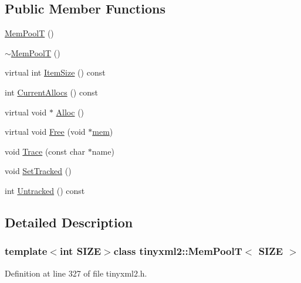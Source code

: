\subsection*{Public Member Functions}
\begin{DoxyCompactItemize}
\item 
\hyperlink{classtinyxml2_1_1_mem_pool_t_a8a69a269ea72e292dde65309528ef64b}{Mem\+Pool\+T} ()
\item 
\hyperlink{classtinyxml2_1_1_mem_pool_t_ad6bb8346ad5b9a34f8f0051da5e3ed3f}{$\sim$\+Mem\+Pool\+T} ()
\item 
virtual int \hyperlink{classtinyxml2_1_1_mem_pool_t_a7ec8778fe99f6e332615a703be0b48bc}{Item\+Size} () const 
\item 
int \hyperlink{classtinyxml2_1_1_mem_pool_t_a56be11b7db6a7ef00db17088a7769aab}{Current\+Allocs} () const 
\item 
virtual void $\ast$ \hyperlink{classtinyxml2_1_1_mem_pool_t_aa9d785a48ffe6ea1be679bab13464486}{Alloc} ()
\item 
virtual void \hyperlink{classtinyxml2_1_1_mem_pool_t_a4f1a0c434e9e3d7391e5c16ed4ee8c70}{Free} (void $\ast$\hyperlink{core_2unittests_2source_2queue_8cpp_a5f00e9b1b039412bb144bae39e66b97a}{mem})
\item 
void \hyperlink{classtinyxml2_1_1_mem_pool_t_a0bc596f271e0f139822c534238b3f244}{Trace} (const char $\ast$name)
\item 
void \hyperlink{classtinyxml2_1_1_mem_pool_t_a7798932414916199a1bc0f9c3f368521}{Set\+Tracked} ()
\item 
int \hyperlink{classtinyxml2_1_1_mem_pool_t_a524b90d0edeac41964c06510757dce0f}{Untracked} () const 
\end{DoxyCompactItemize}


\subsection{Detailed Description}
\subsubsection*{template$<$int S\+I\+Z\+E$>$class tinyxml2\+::\+Mem\+Pool\+T$<$ S\+I\+Z\+E $>$}



Definition at line 327 of file tinyxml2.\+h.



